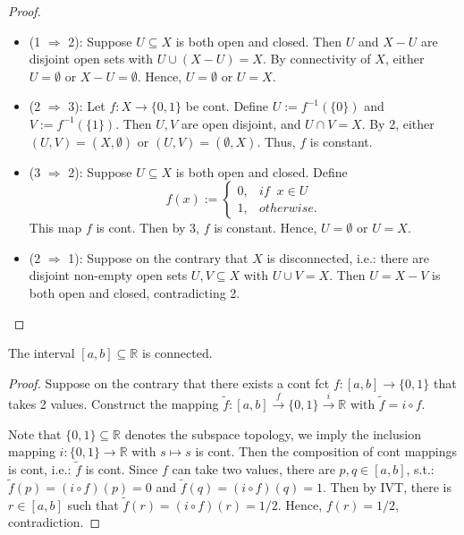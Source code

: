 \begin{proof}
    \begin{itemize}
        \item (1 $\Rightarrow$ 2): Suppose $U \subseteq X$ is both open and closed. Then $U$ and $X-U$ are disjoint open sets with $U \cup (X-U) = X$. By connectivity of $X$, either $U=\emptyset$ or $X-U= \emptyset$. Hence, $U = \emptyset$ or $U=X$.
        \item (2 $\Rightarrow$ 3): Let $f: X \rightarrow \{0,1\}$ be cont. Define $U:= f^{-1}(\{0\})$ and $V:= f^{-1}(\{1\})$. Then $U,V$ are open disjoint, and $U \cap V = X$. By 2, either $(U,V)= (X,\emptyset)$ or $(U,V)= (\emptyset,X)$. Thus, $f$ is constant.
        \item (3 $\Rightarrow$ 2): Suppose $U \subseteq X$ is both open and closed. Define $$ f(x):=
        \begin{cases}
            0,& if \;\; x \in U\\
            1,&otherwise.
        \end{cases}$$
        This map $f$ is cont. Then by 3, $f$ is constant. Hence, $U =\emptyset$ or $U=X$.
        \item (2 $\Rightarrow$ 1): Suppose on the contrary that $X$ is disconnected, i.e.: there are disjoint non-empty open sets $U,V \subseteq X$ with $U \cup V=X$. Then $U=X-V$ is both open and closed, contradicting 2.
    \end{itemize}
\end{proof}

\begin{corollary}
    The interval $[a,b] \subseteq \mathbb{R}$ is connected.
\end{corollary}

\begin{proof}
    Suppose on the contrary that there exists a cont fct $f : [a,b] \rightarrow \{0,1\}$ that takes 2 values. Construct the mapping $\tilde{f} : [a,b] \overset{f}{\rightarrow} \{0,1\} \overset{i}{\rightarrow} \mathbb{R}$ with $\tilde{f} = i \circ f$.

    Note that $\{0,1\} \subseteq \mathbb{R}$ denotes the subspace topology, we imply the inclusion mapping $i : \{0,1\} \rightarrow\mathbb{R}$ with $s \mapsto s$ is cont. Then the composition of cont mappings is cont, i.e.: $\tilde{f}$ is cont. Since $f$ can take two values, there are $p,q \in [a,b]$, s.t.: $\tilde{f}(p) = (i\circ f)(p) = 0$ and $\tilde{f}(q) = (i\circ f)(q) = 1$. Then by IVT, there is $r \in [a,b]$ such that $\tilde{f} (r) = (i \circ f)(r) = 1/2$. Hence, $f(r) = 1/2$, contradiction.
\end{proof}


